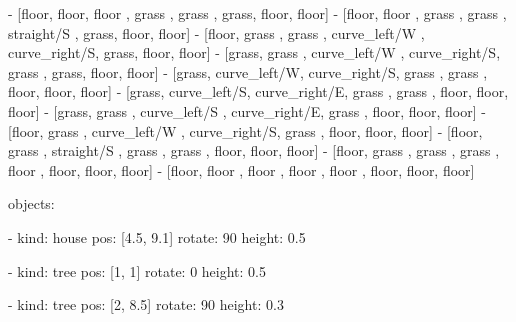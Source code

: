 \documentclass[12pt]{article}
\begin{document}
\noindent- [floor, floor, floor        , grass        , grass        , grass, floor, floor]\newline
\noindent- [floor, floor       , grass        , grass        , straight/S   , grass, floor, floor]\newline
\noindent- [floor, grass       , grass        , curve\_left/W , curve\_right/S, grass, floor, floor]\newline
\noindent- [grass, grass       , curve\_left/W , curve\_right/S, grass        , grass, floor, floor]\newline
\noindent- [grass, curve\_left/W, curve\_right/S, grass        , grass        , floor, floor, floor]\newline
\noindent- [grass, curve\_left/S, curve\_right/E, grass        , grass        , floor, floor, floor]\newline
\noindent- [grass, grass       , curve\_left/S , curve\_right/E, grass        , floor, floor, floor]\newline
\noindent- [floor, grass       , curve\_left/W , curve\_right/S, grass        , floor, floor, floor]\newline
\noindent- [floor, grass       , straight/S   , grass        , grass        , floor, floor, floor]\newline
\noindent- [floor, grass       , grass        , grass        , floor        , floor, floor, floor]\newline
\noindent- [floor, floor       , floor        , floor        , floor        , floor, floor, floor]\newline

\noindent objects:\newline

\noindent- kind: house\newline
  pos: [4.5, 9.1]\newline
  rotate: 90\newline
  height: 0.5\newline

\noindent- kind: tree\newline
  pos: [1, 1]\newline
  rotate: 0\newline
  height: 0.5\newline

\noindent- kind: tree\newline
  pos: [2, 8.5]\newline
  rotate: 90\newline
  height: 0.3\newline
\end{document}
